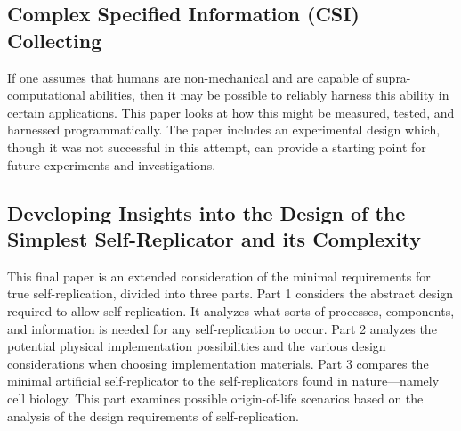 \subsection*{Complex Specified Information (CSI) Collecting}

If one assumes that humans are non-mechanical and are capable of supra-computational abilities, then
it may be possible to reliably harness this ability in certain applications.  This paper looks at
how this might be measured, tested, and harnessed programmatically.  The paper includes an experimental
design which, though it was not successful in this attempt, can provide a starting point for future
experiments and investigations.

\subsection*{Developing Insights into the Design of the Simplest Self-Replicator and its Complexity}

This final paper is an extended consideration of the minimal requirements for true self-replication, divided
into three parts.  Part 1 considers the abstract design required to allow self-replication.  It analyzes
what sorts of processes, components, and information is needed for any self-replication to occur.  
Part 2 analyzes the potential physical implementation possibilities and the various design considerations
when choosing implementation materials.  Part 3 compares the minimal artificial self-replicator to 
the self-replicators found in nature---namely cell biology.  This part examines possible origin-of-life
scenarios based on the analysis of the design requirements of self-replication.

